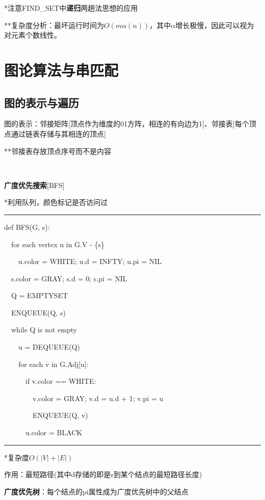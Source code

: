 \documentclass[a4paper,UTF8,fontset=windows]{ctexart}
\newenvironment{code}{\rule{36em}{0.1em}\setlength{\parindent}{1em}

}{

\setlength{\parindent}{0em}\rule{36em}{0.1em}}
\begin{document}
*\hspace{0em}注意FIND\_SET中\textbf{递归}两趟法思想的应用

**\hspace{0em}复杂度分析：最坏运行时间为$O(m\alpha(n))$，其中$\alpha$增长极慢，因此可以视为对元素个数线性。

\section{图论算法与串匹配}
\subsection{图的表示与遍历}
图的表示：邻接矩阵[顶点作为维度的01方阵，相连的有向边为1]、邻接表[每个顶点通过链表存储与其相连的顶点]

**\hspace{0em}邻接表存放顶点序号而不是内容

\

\textbf{广度优先搜索}[BFS]

*\hspace{0em}利用队列，颜色标记是否访问过

\begin{code}
def BFS(G, s):

\ \ for each vertex u in G.V - \{s\}

\ \ \ \ u.color = WHITE; u.d = INFTY; u.pi = NIL

\ \ s.color = GRAY; s.d = 0; s.pi = NIL

\ \ Q = EMPTYSET

\ \ ENQUEUE(Q, s)

\ \ while Q is not empty

\ \ \ \ u = DEQUEUE(Q)

\ \ \ \ for each v in G.Adj[u]:

\ \ \ \ \ \ if v.color == WHITE:

\ \ \ \ \ \ \ \ v.color = GRAY; v.d = u.d + 1; v.pi = u

\ \ \ \ \ \ \ \ ENQUEUE(Q, v)

\ \ \ \ \ \ u.color = BLACK
\end{code}

*\hspace{0em}复杂度$O(|V|+|E|)$

作用：最短路径(其中d存储的即是s到某个结点的最短路径长度)

\textbf{广度优先树}：每个结点的pi属性成为广度优先树中的父结点

\
\end{document}
